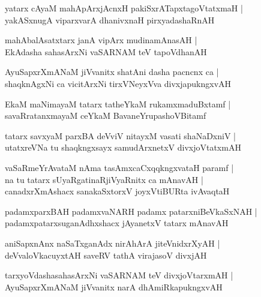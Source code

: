 \documentclass[twoside,12pt,openright]{book}
\newcounter{shloka}[chapter]
\begin{document}
\begin{shloka}
yatarx cAyaM mahApArxjAcnxH pakiSxrATapxtagoVtatxmaH |\\
yakASxnugA viparxvarA  dhanivxnaH pirxyadashaRnAH
\end{shloka}

\begin{shloka}
mahAbalAsatxtarx janA vipArx mudinamAnasAH |\\
EkAdasha sahasArxNi vaSARNAM teV tapoVdhanAH
\end{shloka}

\begin{shloka}
AyuSapxrXmANaM jiVvanitx shatAni dasha pacncnx ca |\\
shaqknAgxNi ca vicitArxNi tirxVNeyxVva divxjapukngxvAH
\end{shloka}

\begin{shloka}
EkaM maNimayaM tatarx tatheYkaM rukamxmaduBxtamf |\\
savaRratanxmayaM ceYkaM BavaneYrupashoVBitamf
\end{shloka}

\begin{shloka}
tatarx savxyaM parxBA deVviV nitayxM vasati shaNaDxniV |\\
utatxreVNa tu shaqkngxsayx samudArxnetxV divxjoVtatxmAH
\end{shloka}

\begin{shloka}
vaSaRmeYrAvataM nAma tasAmxcaCxqqkngxvataH paramf |\\
na tu tatarx sUyaRgatinaRjiVyaRnitx ca mAnavAH |\\
canadxrXmAshacx sanakaSxtorxV joyxVtiBURta ivAvaqtaH
\end{shloka}

\begin{shloka}
padamxparxBAH padamxvaNARH padamx patarxniBeVkaSxNAH |\\
padamxpatarxsuganAdhxshacx jAyanetxV tatarx mAnavAH
\end{shloka}

\begin{shloka}
aniSapxnAnx naSaTxganAdx nirAhArA jiteVnidxrXyAH |\\
deVvaloVkacuyxtAH saveRV tathA virajasoV divxjAH
\end{shloka}

\begin{shloka}
tarxyoVdashasahasArxNi vaSARNAM teV divxjoVtarxmAH |\\
AyuSapxrXmANaM jiVvanitx narA dhAmiRkapukngxvAH
\end{shloka}
\end{document}
